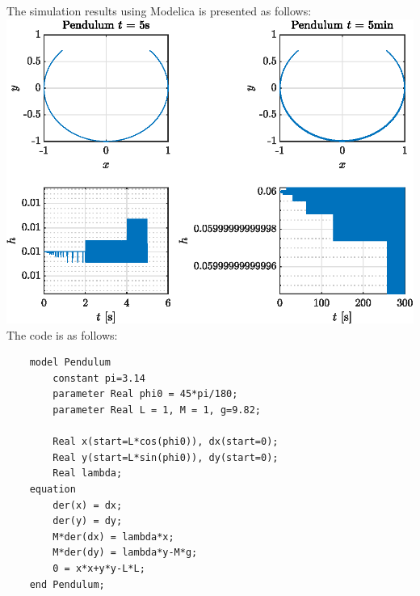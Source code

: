 The simulation results using Modelica is presented as follows: \\
\includegraphics[width=\textwidth]{Figures/Ugf2_29.eps}
The code is as follows:
\begin{lstlisting}
	model Pendulum
		constant pi=3.14
		parameter Real phi0 = 45*pi/180;
		parameter Real L = 1, M = 1, g=9.82;

		Real x(start=L*cos(phi0)), dx(start=0);
		Real y(start=L*sin(phi0)), dy(start=0);
		Real lambda;
	equation
		der(x) = dx;
		der(y) = dy;
		M*der(dx) = lambda*x;
		M*der(dy) = lambda*y-M*g;
		0 = x*x+y*y-L*L;
	end Pendulum;
\end{lstlisting}